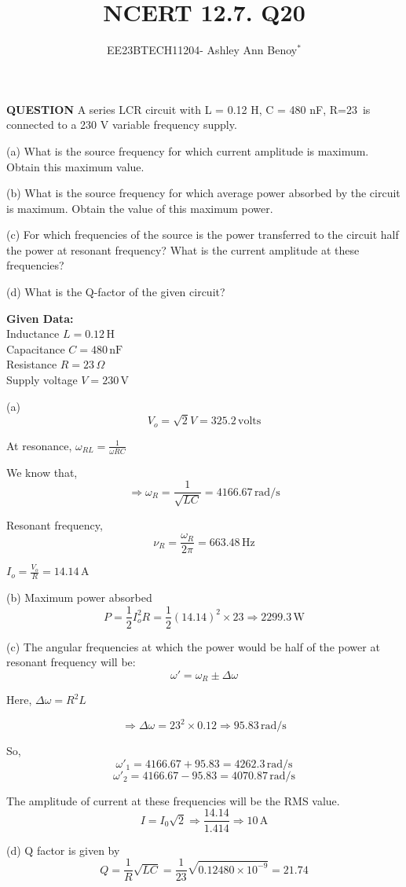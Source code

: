 \documentclass[journal,12pt,twocolumn]{IEEEtran}
\theoremstyle{remark}
\begin{document}

\vspace{3cm}

\title{NCERT 12.7. Q20}
\author{EE23BTECH11204- Ashley Ann Benoy$^{*}$%
}
\maketitle
\newpage
\bigskip

\renewcommand{\thefigure}{\theenumi}
\renewcommand{\thetable}{\theenumi}



\textbf{
QUESTION}
A series LCR circuit with 
L = 0.12 H,
C = 480 nF, 
R=23\textOmega\
is connected to a 230 V variable frequency supply.

(a) What is the source frequency for which current amplitude is maximum. Obtain this maximum value.

(b) What is the source frequency for which average power absorbed by the circuit is maximum. Obtain the value of this maximum power.

(c) For which frequencies of the source is the power transferred to the circuit half the power at resonant frequency? What is the current amplitude at these frequencies?

(d) What is the Q-factor of the given circuit?\

\textbf{Given Data:} \\
Inductance \(L = 0.12 \, \text{H}\) \\
Capacitance \(C = 480 \, \text{nF}\) \\
Resistance \(R = 23 \, \Omega\) \\
Supply voltage \(V = 230 \, \text{V}\)

(a)
\[ V_o = \sqrt{2}V = 325.2 \, \text{volts} \]

At resonance, \( \omega_{RL} = \frac{1}{\omega RC} \)

We know that,
\[ \Rightarrow \omega_R = \frac{1}{\sqrt{LC}} = 4166.67 \, \text{rad/s} \]

Resonant frequency,
\[ \nu_R = \frac{\omega_R}{2\pi} = 663.48 \, \text{Hz} \]

\( I_o = \frac{V_o}{R} = 14.14 \, \text{A} \)

(b)
Maximum power absorbed
\[ P = \frac{1}{2}I_o^2R = \frac{1}{2}(14.14)^2 \times 23 \Rightarrow 2299.3 \, \text{W} \]

(c)
The angular frequencies at which the power would be half of the power at resonant frequency will be:
\[ \omega' = \omega_R \pm \Delta\omega \]

Here, \( \Delta\omega = R^2L \)

\[ \Rightarrow \Delta\omega = 23^2 \times 0.12 \Rightarrow 95.83 \, \text{rad/s} \]

So,
\[ \omega'_1 = 4166.67 + 95.83 = 4262.3 \, \text{rad/s} \]
\[ \omega'_2 = 4166.67 - 95.83 = 4070.87 \, \text{rad/s} \]

The amplitude of current at these frequencies will be the RMS value.
\[ I = I_0\sqrt{2} \Rightarrow \frac{14.14}{1.414} \Rightarrow 10 \, \text{A} \]

(d)
Q factor is given by
\[ Q = \frac{1}{R}\sqrt{LC} = \frac{1}{23}\sqrt{0.12480 \times 10^{-9}} = 21.74 \]
\end{document}

